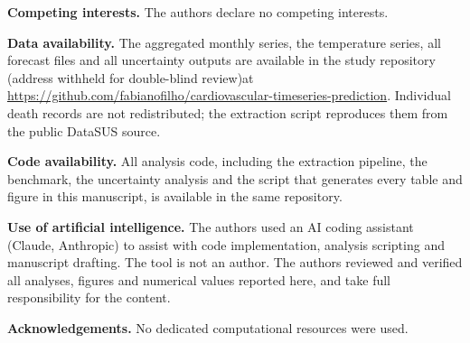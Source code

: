 \textbf{Competing interests.} The authors declare no competing interests.

\textbf{Data availability.} The aggregated monthly series, the temperature series, all
forecast files and all uncertainty outputs are available in the study repository
\ifdefined\BLIND(address withheld for double-blind review)\else at
\url{https://github.com/fabianofilho/cardiovascular-timeseries-prediction}\fi. Individual death
records are not redistributed; the extraction script reproduces them from the public DataSUS
source.

\textbf{Code availability.} All analysis code, including the extraction pipeline, the
benchmark, the uncertainty analysis and the script that generates every table and figure in
this manuscript, is available in the same repository.

\textbf{Use of artificial intelligence.} The authors used an AI coding assistant
(Claude, Anthropic) to assist with code implementation, analysis scripting and manuscript
drafting. The tool is not an author. The authors reviewed and verified all analyses, figures
and numerical values reported here, and take full responsibility for the content.

\ifdefined\BLIND\else
\textbf{Acknowledgements.} No dedicated computational resources were used.
\fi





